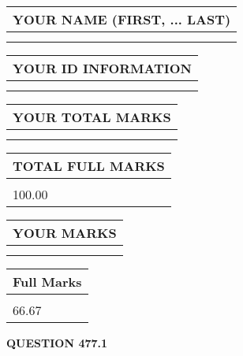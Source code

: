 \documentclass{ctexart}
\begin{document}
   
   
   
\newpage 
\setcounter{page}{ 
   477001 } 
   
   
   
   
\noindent\begin{tabular}{|l|}
\hline
YOUR NAME (FIRST, ... LAST)  \\
\hline
 \\ 
 \\ 
\hline
\end{tabular}
\hspace{0.05in} \begin{tabular}{|l|}
\hline
 YOUR   ID   INFORMATION  \\
\hline
 \\ 
 \\ 
\hline
\end{tabular}
   
   
\vspace{0.2in}\noindent\begin{tabular}{|l|}
\hline
YOUR TOTAL MARKS  \\
\hline
 \\ 
 \\ 
\hline
\end{tabular}
\hspace{0.05in} \begin{tabular}{|l|}
\hline
TOTAL FULL MARKS  \\
\hline
 \\ 
100.00 \\
\hline
\end{tabular}
   
   
 \vspace{0.2in}
 
 
 
 
   
   
  
\vspace{0.2in}
  
\noindent\begin{tabular}{|l|}
\hline
 YOUR MARKS  \\
\hline
 \\ 
 \\ 
\hline
\end{tabular}
\hspace{0.05in} \begin{tabular}{|l|}
\hline
 Full Marks  \\
\hline
 \\ 
66.67 \\
\hline
\end{tabular}
{\textbf{\Large{QUESTION
477.1 
}}}
  
\end{document}
